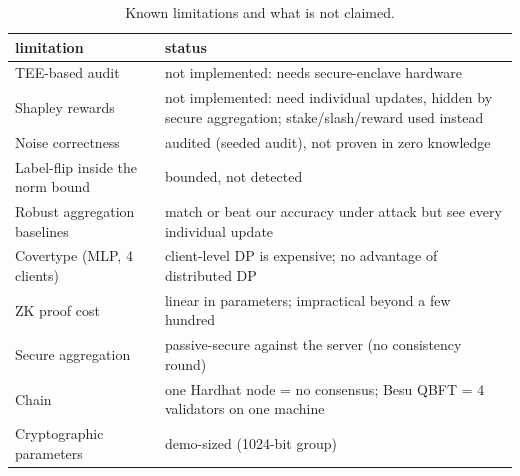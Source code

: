 \begin{table}
\caption{Known limitations and what is not claimed.}
\label{tab:T22_limitations}
\begin{tabular}{ll}
\toprule
limitation & status \\
\midrule
TEE-based audit & not implemented: needs secure-enclave hardware \\
Shapley rewards & not implemented: need individual updates, hidden by secure aggregation; stake/slash/reward used instead \\
Noise correctness & audited (seeded audit), not proven in zero knowledge \\
Label-flip inside the norm bound & bounded, not detected \\
Robust aggregation baselines & match or beat our accuracy under attack but see every individual update \\
Covertype (MLP, 4 clients) & client-level DP is expensive; no advantage of distributed DP \\
ZK proof cost & linear in parameters; impractical beyond a few hundred \\
Secure aggregation & passive-secure against the server (no consistency round) \\
Chain & one Hardhat node = no consensus; Besu QBFT = 4 validators on one machine \\
Cryptographic parameters & demo-sized (1024-bit group) \\
\bottomrule
\end{tabular}
\end{table}
